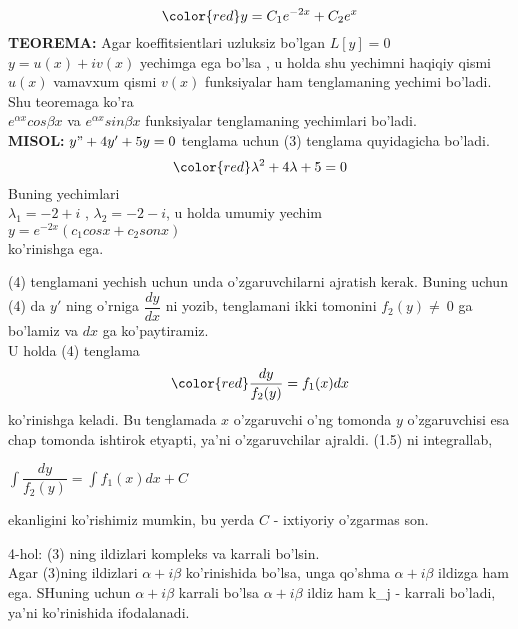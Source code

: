 \documentclass{beamer}
\begin{document}
\begin{frame}
\begin{equation}
\color{red}   y = C_{1}e^{-2x} + C_{2}e^{x}   
\end{equation}
\textbf{TEOREMA:} Agar koeffitsientlari uzluksiz bo’lgan $L[y] = 0$ $y = u(x) + iv(x)$ yechimga  ega bo’lsa , u holda  shu yechimni haqiqiy qismi $u(x)$ vamavxum qismi $v(x) $ funksiyalar  ham tenglamaning yechimi bo’ladi.\\
Shu teoremaga ko’ra\\
$e^{\alpha x}cos\beta x$ va  $e^{\alpha x}sin\beta x$ funksiyalar tenglamaning yechimlari bo’ladi.\\
\textbf{MISOL:} $y" + 4y' + 5y = 0$  tenglama uchun (3) tenglama quyidagicha  bo’ladi.
\begin{equation}
\color{red}  \lambda^{2} + 4\lambda + 5 = 0   
\end{equation}
Buning yechimlari\\
$\lambda_{1} = -2 + i$ , $\lambda_{2} = -2-i$, u holda umumiy yechim\\
$y = e^{-2x}(c_{1}cosx + c_{2}sonx)$\\
ko’rinishga ega.
\end{frame}

\begin{frame}
\quad (4) tenglamani yechish uchun unda o’zgaruvchilarni ajratish kerak. Buning uchun (4) da $y'$ ning o’rniga $\dfrac{dy}{dx}$ ni yozib, tenglamani ikki tomonini $f_2(y)\neq\ 0$ ga bo’lamiz va $dx$ ga ko’paytiramiz.\\
U holda (4) tenglama\\
\begin{equation}
\color{red}    \dfrac{dy}{f_2(y)}=f_1(x)dx
\end{equation}
ko’rinishga keladi. Bu tenglamada $x$ o’zgaruvchi o’ng tomonda $y$ o’zgaruvchisi esa chap tomonda ishtirok etyapti, ya’ni o’zgaruvchilar ajraldi. (1.5) ni integrallab,\\
\begin{center}
\color{red}    $\int\dfrac{dy}{f_2(y)}=\int f_1(x)dx+C$
\end{center}
ekanligini ko’rishimiz mumkin, bu yerda $C$ - ixtiyoriy o’zgarmas son.
\end{frame}
\begin{frame}
4-hol:  (3) ning ildizlari  kompleks va karrali bo’lsin. \\
Agar (3)ning ildizlari $\alpha + i\beta$ ko’rinishida bo’lsa, unga qo’shma $\alpha + i\beta$  ildizga ham ega. SHuning uchun $\alpha + i\beta$ karrali bo’lsa $\alpha + i\beta$  ildiz  ham  k_{j} -  karrali bo’ladi, ya’ni  ko’rinishida ifodalanadi.  
\end{frame}
\end{document}
